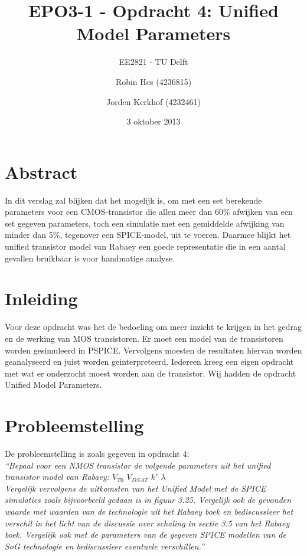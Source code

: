 \documentclass{scrartcl}
\author{Robin Hes (4236815) \and Jorden Kerkhof (4232461)}
\title{EPO3-1 - Opdracht 4: Unified Model Parameters}
\subtitle{EE2821 - TU Delft}
\date{3 oktober 2013}
\begin{document}
\maketitle

\section*{Abstract}
\label{sec:ump-abstr}
In dit verslag zal blijken dat het mogelijk is, om met een set berekende parameters voor een CMOS-transistor die allen meer dan 60\% afwijken van een set gegeven parameters, toch een simulatie met een gemiddelde afwijking van minder dan 5\%, tegenover een SPICE-model, uit te voeren. Daarmee blijkt het unified transistor model van Rabaey een goede representatie die in een aantal gevallen bruikbaar is voor handmatige analyse.

\newpage
\tableofcontents

\section{Inleiding}
\label{sec:ump-inl}
Voor deze opdracht was het de bedoeling om meer inzicht te krijgen in het gedrag en de werking van MOS transistoren. Er moet een model van de transistoren worden gesimuleerd in PSPICE. Vervolgens moesten de resultaten hiervan worden geanalyseerd en juist worden geinterpreteerd. Iedereen kreeg een eigen opdracht met wat er onderzocht moest worden aan de transistor. Wij hadden de opdracht Unified Model Parameters.

\newpage
\section{Probleemstelling}
\label{sec:ump-prob}
De probleemstelling is zoals gegeven in opdracht 4: \\
\textit{
``Bepaal voor een NMOS transistor de volgende parameters uit het unified transistor model van Rabaey:
$V_{T0}$ \quad $V_{DSAT}$ \quad $k'$ \quad $\lambda$ \\
Vergelijk vervolgens de uitkomsten van het Unified Model met de SPICE simulaties zoals bijvoorbeeld
gedaan is in figuur 3.25. Vergelijk ook de gevonden waarde met waarden van de technologie uit het Rabaey
boek en bediscussieer het verschil in het licht van de discussie over schaling in sectie 3.5 van het Rabaey
boek. Vergelijk ook met de parameters van de gegeven SPICE modellen van de SoG technologie en bediscussieer
eventuele verschillen.''
}
\cite[4]{epo3-opdracht-4}
\end{document}
